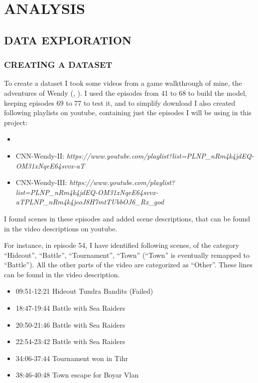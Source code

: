 \documentclass[
]{article}
\providecommand{\tightlist}{%
  \setlength{\itemsep}{0pt}\setlength{\parskip}{0pt}}
\newcommand{\hhref}[3][blue]{\href{#2}{\color{#1}{#3}}}%
\begin{document}
\hypertarget{analysis}{%
\section{ANALYSIS}\label{analysis}}

\hypertarget{data-exploration}{%
\subsection{DATA EXPLORATION}\label{data-exploration}}

\hypertarget{creating-a-dataset}{%
\subsubsection{CREATING A DATASET}\label{creating-a-dataset}}

To create a dataset I took some videos from a game walkthrough of mine,
the adventures of Wendy (\hhref{https://www.youtube.com/playlist?list=PLNP_nRm4k4jfNLo7FkjXewFH9Xe5Uc2Pa}{I}, \hhref{https://www.youtube.com/playlist?list=PLNP_nRm4k4jd-AJ0GwTPS1ld2YP8FdT4h}{II}). 
I used the episodes from 41 to 68 to build the model, keeping episodes 69 to 77 to test it, and to simplify download I also created following playlists on youtube, containing just the episodes I will be using in this project:

\begin{itemize}
\tightlist
\item
  \hhref{https://www.youtube.com/playlist?list=PLNP_nRm4k4jfVfQobYTRQAXV\_uOzt8Bov}{CNN-Wendy-I}
\item
  CNN-Wendy-II:
  \emph{https://www.youtube.com/playlist?list=PLNP\_nRm4k4jdEQ-OM31xNqeE64svvx-aT}
\item
  CNN-Wendy-III:
  \emph{https://www.youtube.com/playlist?list=PLNP\_nRm4k4jdEQ-OM31xNqeE64svvx-aTPLNP\_nRm4k4jeoJ8H7mtTUbbOJ6\_Rx\_god}
\end{itemize}

I found scenes in these episodes and added scene descriptions, that can
be found in the video descriptions on youtube.

For instance, in episode 54, I have identified following scenes, of the
category ``Hideout'', ``Battle'', ``Tournament'', ``Town'' (``Town'' is
eventually remapped to ``Battle''). All the other parts of the video are
categorized as ``Other''. These lines can be found in the video
description.

\begin{itemize}
\tightlist
\item
  09:51-12:21 Hideout Tundra Bandits (Failed)
\item
  18:47-19:44 Battle with Sea Raiders
\item
  20:50-21:46 Battle with Sea Raiders
\item
  22:54-23:42 Battle with Sea Raiders
\item
  34:06-37:44 Tournament won in Tihr
\item
  38:46-40:48 Town escape for Boyar Vlan
\end{itemize}
\end{document}
